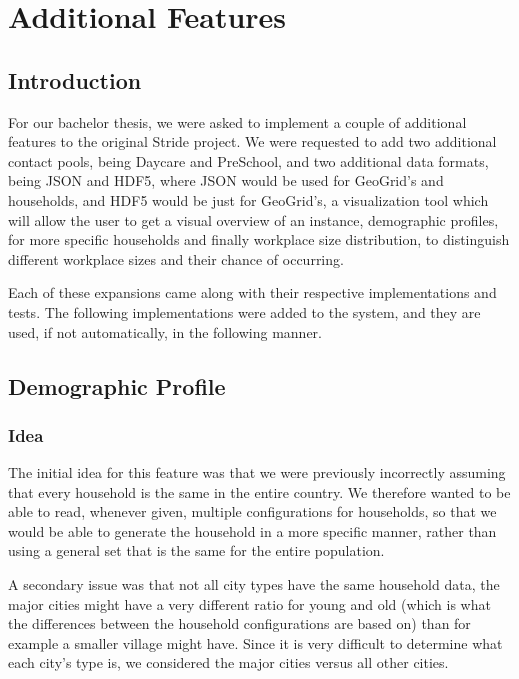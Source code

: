 \chapter{Additional Features}
\label{chap:code}


\section{Introduction}
\label{section:AdditionalFeatureIntro}

For our bachelor thesis, we were asked to implement a couple of additional features to the original Stride project. We were requested to add two additional contact pools, being Daycare and PreSchool, and two additional data formats, being JSON and HDF5, where JSON would be used for GeoGrid's and households, and HDF5 would be just for GeoGrid's, a visualization tool which will allow the user to get a visual overview of an instance, demographic profiles, for more specific households and finally workplace size distribution, to distinguish different workplace sizes and their chance of occurring.

Each of these expansions came along with their respective implementations and tests. The following implementations were added to the system, and they are used, if not automatically, in the following manner.



\section{Demographic Profile}
\label{section:demographicprofile}

\subsection{Idea}

The initial idea for this feature was that we were previously incorrectly assuming that every household is the same in the entire country. We therefore wanted to be able to read, whenever given, multiple configurations for households, so that we would be able to generate the household in a more specific manner, rather than using a general set that is the same for the entire population.

A secondary issue was that not all city types have the same household data, the major cities might have a very different ratio for young and old (which is what the differences between the household configurations are based on) than for example a smaller village might have. Since it is very difficult to determine what each city's type is, we considered the major cities versus all other cities.

